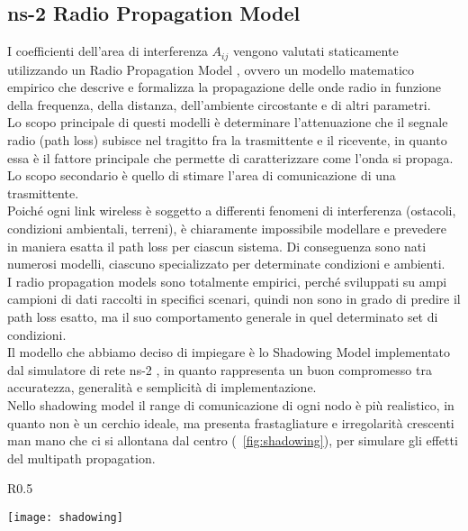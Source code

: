 \subsection{ns-2 Radio Propagation Model}
I coefficienti dell'area di interferenza $A_{ij}$ vengono valutati staticamente utilizzando un Radio Propagation Model \cite{seybold2005introduction}, ovvero un modello matematico empirico che descrive e formalizza la propagazione delle onde radio in funzione della frequenza, della distanza, dell'ambiente circostante e di altri parametri. \\
Lo scopo principale di questi modelli è determinare l'attenuazione che il segnale radio (path loss) subisce nel tragitto fra la trasmittente e il ricevente, in quanto essa è il fattore principale che permette di caratterizzare come l'onda si propaga. Lo scopo secondario è quello di stimare l'area di comunicazione di una trasmittente.\\
Poiché ogni link wireless è soggetto a differenti fenomeni di interferenza (ostacoli, condizioni ambientali, terreni), è chiaramente impossibile modellare e prevedere in maniera esatta il path loss per ciascun sistema. Di conseguenza sono nati numerosi modelli, ciascuno specializzato per determinate condizioni e ambienti. \\
I radio propagation models sono totalmente empirici, perché sviluppati su ampi campioni di dati raccolti in specifici scenari, quindi non sono in grado di predire il path loss esatto, ma il suo comportamento generale in quel determinato set di condizioni.  \\
Il modello che abbiamo deciso di impiegare è lo Shadowing Model implementato dal simulatore di rete ns-2 \cite{nsMan}, in quanto rappresenta un buon compromesso tra accuratezza, generalità e semplicità di implementazione. \\
Nello shadowing model il range di comunicazione di ogni nodo è più realistico, in quanto non è un cerchio ideale, ma presenta frastagliature e irregolarità crescenti man mano che ci si allontana dal centro (\figurename\ \ref{fig:shadowing}), per simulare gli effetti del multipath propagation. \\

\begin{wrapfigure}{R}{0.5\textwidth}
	\begin{center}
		\texttt{[image: shadowing]}
	\end{center}
	\caption{Range di comunicazione nello Shadowing Model\label{fig:shadowing}}
\end{wrapfigure}

